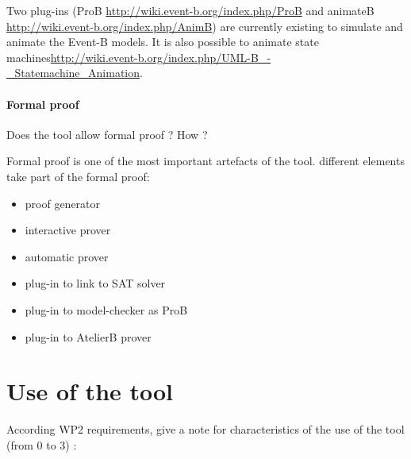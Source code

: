 \begin{author_comment}

Two plug-ins (ProB \url{http://wiki.event-b.org/index.php/ProB} and animateB \url{http://wiki.event-b.org/index.php/AnimB}) are currently existing to simulate and animate the Event-B models. It is also possible to animate state machines\url{http://wiki.event-b.org/index.php/UML-B_-_Statemachine_Animation}.
\end{author_comment}

\paragraph{Formal proof}
Does the tool allow formal proof ?  How ?

\begin{author_comment}

Formal proof is one of the most important artefacts of the tool. different elements take part of the formal proof:
\begin{itemize}
\item proof generator
\item interactive prover
\item automatic prover
\item plug-in to link to SAT solver
\item plug-in to model-checker as ProB
\item plug-in to AtelierB prover
\end{itemize}
\end{author_comment}


\section{Use of the tool}


According WP2 requirements, give a note for characteristics of the use of the tool (from 0 to 3) :

